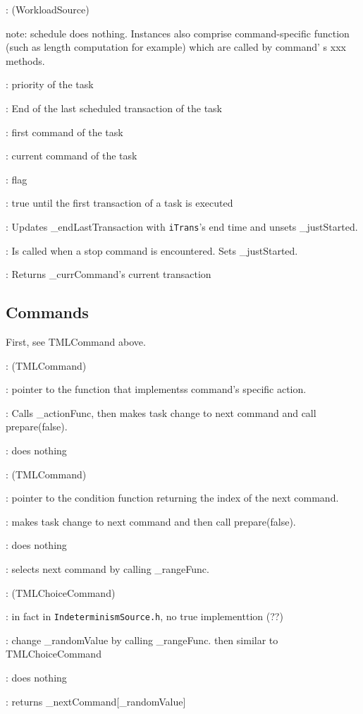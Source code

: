 \documentclass[a4paper,11pt]{article}
\newcommand{\bfont}{\fontseries{b}\selectfont}
\newcommand{\cod}[1]{{\ttfamily #1}}
\newcommand{\class}[2]{\par\vspace{1mm}\hspace{-5mm}\large\colorbox{file}{\textbullet\bfont\cod{#1}:} (\cod{#2})\par}
\newcommand{\method}[1]{\par\vspace{1mm}\hspace{-2mm}\colorbox{method}{\textopenbullet\bfont\cod{#1}:}}
\newcommand{\variable}[1]{\par\vspace{1mm}\hspace{-2mm}\colorbox{variable}{\textopenbullet\bfont\cod{#1}:}}
\begin{document}
\class{Task}{WorkloadSource}
note: \cod{schedule} does nothing. Instances also comprise command-specific function (such as length computation for example) which are called by command' s \cod{xxx} methods.

\variable{\_priority} priority of the task
\variable{\_endLastTransaction} End of the last scheduled transaction of the task
\variable{\_firstCommand} first command of the task
\variable{\_currCommand} current command of the task
\variable{\_isDaemon} flag
\variable{\_justStarted} true until the first transaction of a task is executed
\method{addTransaction(iTrans)} Updates \cod{\_endLastTransaction} with {\tt iTrans}'s end time and unsets \cod{\_justStarted}.
\method{finished()} Is called when a stop command is encountered. Sets \cod{\_justStarted}.
\method{getNextTransaction(iEndSchedule)} Returns \cod{\_currCommand}'s current transaction

\subsection*{Commands}
First, see \cod{TMLCommand} above.
\class{TMLActionCommand}{TMLCommand}
\variable{\_actionFunc} pointer to the function that implementss command's specific action.
\method{prepareNextTransaction()} Calls \cod{\_actionFunc}, then makes task change to next command and call \cod{prepare(false)}.
\method{execute()} does nothing

\class{TMLChoiceCommand}{TMLCommand}
\variable{\_rangeFunc} pointer to the condition function returning the index of the next command.
\method{prepareNextTransaction()} makes task change to next command and then call \cod{pre\-pa\-re(false)}.
\method{execute()} does nothing
\method{getNextCommands()} selects next command by calling \cod{\_rangeFunc}.

\class{TMLRandomChoiceCommand}{TMLChoiceCommand}
\variable{\_randomValue} in fact in {\tt IndeterminismSource.h}, no true implementtion (??)
\method{prepareNextTransaction()} change \cod{\_randomValue} by calling \cod{\_rangeFunc}. then similar to \cod{TMLChoiceCommand}
\method{execute()} does nothing
\method{getNextCommands()} returns \cod{\_nextCommand[\_randomValue]}
\end{document}
